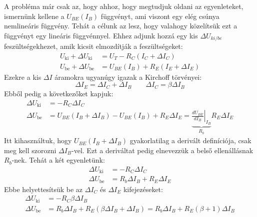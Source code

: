 \documentclass[../main.tex]{subfiles}
\begin{document}
A probléma már csak az, hogy ahhoz, hogy megtudjuk oldani az egyenleteket, ismernünk kellene a $U_{BE}(I_B)$ függvényt, ami viszont egy elég csúnya nemlineáris függvény. Tehát a célunk az lesz, hogy valahogy közelítsük ezt a függvényt egy lineáris függvénnyel.
Ehhez adjunk hozzá egy kis $\Delta U_{ki/be}$ feszültségekhezet, amik kicsit elmozdítják a feszültségeket:
\begin{equation}
    \begin{aligned}
        U_{\text{ki}} + \Delta U_{\text{ki}} &= U_T - R_C (I_C + \Delta I_C) \\
        U_{\text{be}} + \Delta U_{\text{be}} &= U_{BE}(I_B) + R_E (I_E + \Delta I_E)
    \end{aligned}
\end{equation}
Ezekre a kis $\Delta I$ áramokra ugyanúgy igazak a Kirchoff törvényei:
\begin{equation}
    \Delta I_E = \Delta I_C + \Delta I_B \qquad \Delta I_C = \beta \Delta I_B
\end{equation}
Ebből pedig a következőket kapjuk:
\begin{equation}
    \begin{aligned}
        \Delta U_{\text{ki}} &= - R_C \Delta I_C \\
        \Delta U_{\text{be}} &= U_{BE}(I_B + \Delta I_B) - U_{BE}(I_B) + R_E \Delta I_E = \underbrace{\left.\frac{dU_{BE}}{dI_B}\right|_{I_B}}_{R_b} R_E \Delta I_E
    \end{aligned}
\end{equation}
Itt kihasználtuk, hogy $U_{BE}(I_B + \Delta I_B)$ gyakorlatilag a derivált definíciója, csak meg kell szorozni $\Delta I_B$-vel. Ezt a deriváltat pedig elnevezzük a belső ellenállásnak $R_b$-nek.
Tehát a két egyenletünk:
\begin{equation}
    \begin{aligned}
        \Delta U_{\text{ki}} &= - R_C \Delta I_C \\
        \Delta U_{\text{be}} &= R_b \Delta I_B + R_E \Delta I_E 
    \end{aligned}
\end{equation}
Ebbe helyettesítsük be az $\Delta I_C$ és $\Delta I_E$ kifejezéseket:
\begin{equation}
    \begin{aligned}
        \Delta U_{\text{ki}} &= - R_C \beta \Delta I_B \\
        \Delta U_{\text{be}} &= R_b \Delta I_B + R_E ( \beta \Delta I_B + \Delta I_B ) = R_b \Delta I_B + R_E (\beta + 1) \Delta I_B
    \end{aligned}
\end{equation}
\end{document}
